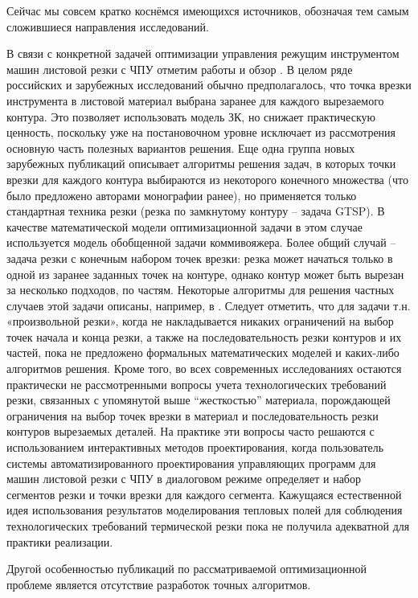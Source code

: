 \documentclass[12pt,twoside]{report}
\begin{document}
Сейчас мы совсем кратко коснёмся имеющихся источников,
обозначая тем самым сложившиеся направления исследований.

В связи с конкретной задачей оптимизации управления
режущим инструментом машин листовой резки с ЧПУ
отметим работы
\cite{intro03,intro04,intro05,intro06,intro07,intro08,intro09,Cha10`,intro11,intro12}
и обзор \cite{intro13}.
В целом ряде российских и зарубежных исследований обычно предполагалось,
что точка врезки инструмента в листовой материал
выбрана заранее для каждого вырезаемого контура.
Это позволяет использовать модель ЗК,
но снижает практическую ценность,
поскольку уже на постановочном уровне
исключает из рассмотрения основную часть
полезных вариантов решения.
Еще одна группа новых зарубежных публикаций
описывает алгоритмы решения задач,
в которых точки врезки для каждого контура
выбираются из некоторого конечного множества
(что было предложено авторами монографии ранее),
но применяется только стандартная техника резки
(резка по замкнутому контуру – задача GTSP).
В качестве математической модели оптимизационной задачи
в этом случае используется модель обобщенной задачи коммивояжера.
Более общий случай – задача резки с конечным набором точек врезки:
резка может начаться только в одной из заранее заданных точек на контуре,
однако контур может быть вырезан за несколько подходов,
по частям.
Некоторые алгоритмы для решения частных случаев
этой задачи описаны, например,
в \cite{intro12,intro14}.
Следует отметить, что для задачи т.н. «произвольной резки»,
когда не накладывается никаких ограничений
на выбор точек начала и конца резки,
а также на последовательность резки контуров и их частей,
пока не предложено формальных математических моделей
и каких-либо алгоритмов решения.
Кроме того, во всех современных исследованиях
остаются практически не рассмотренными
вопросы учета технологических требований резки,
связанных с упомянутой выше “жесткостью” материала,
порождающей ограничения на выбор точек врезки в материал
и последовательность резки контуров вырезаемых деталей.
На практике эти вопросы часто решаются
с использованием интерактивных методов проектирования,
когда пользователь системы автоматизированного проектирования
управляющих программ для машин листовой резки с ЧПУ
в диалоговом режиме определяет и набор сегментов резки
и точки врезки для каждого сегмента.
Кажущаяся естественной идея использования результатов
моделирования тепловых полей для соблюдения
технологических требований термической резки
пока не получила адекватной для практики реализации.

Другой особенностью публикаций
по рассматриваемой оптимизационной проблеме
является отсутствие разработок точных алгоритмов.
\end{document}
